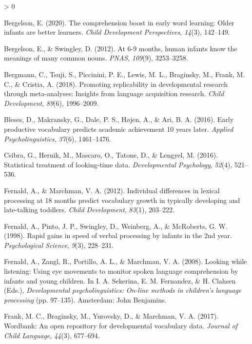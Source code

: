 \documentclass[
  english,
  man,floatsintext]{apa6}
\newlength{\cslhangindent}
\newenvironment{CSLReferences}[2] %
 {%
  \setlength{\parindent}{0pt}
  \ifodd #1 \everypar{\setlength{\hangindent}{\cslhangindent}}\ignorespaces\fi
  \ifnum #2 > 0
  \setlength{\parskip}{#2\baselineskip}
  \fi
 }%
 {}
\begin{document}
\hypertarget{refs}{}
\begin{CSLReferences}{1}{0}
\leavevmode\hypertarget{ref-bergelson2020}{}%
Bergelson, E. (2020). The comprehension boost in early word learning: Older infants are better learners. \emph{Child Development Perspectives}, \emph{14}(3), 142--149.

\leavevmode\hypertarget{ref-bergelson2012}{}%
Bergelson, E., \& Swingley, D. (2012). {At 6-9 months, human infants know the meanings of many common nouns.} \emph{PNAS}, \emph{109}(9), 3253--3258.

\leavevmode\hypertarget{ref-bergmann2018}{}%
Bergmann, C., Tsuji, S., Piccinini, P. E., Lewis, M. L., Braginsky, M., Frank, M. C., \& Cristia, A. (2018). {Promoting replicability in developmental research through meta-analyses: Insights from language acquisition research}. \emph{Child Development}, \emph{89}(6), 1996--2009.

\leavevmode\hypertarget{ref-bleses2016}{}%
Bleses, D., Makransky, G., Dale, P. S., Højen, A., \& Ari, B. A. (2016). {Early productive vocabulary predicts academic achievement 10 years later}. \emph{Applied Psycholinguistics}, \emph{37}(6), 1461--1476.

\leavevmode\hypertarget{ref-csibra2016}{}%
Csibra, G., Hernik, M., Mascaro, O., Tatone, D., \& Lengyel, M. (2016). {Statistical treatment of looking-time data}. \emph{Developmental Psychology}, \emph{52}(4), 521--536.

\leavevmode\hypertarget{ref-fernald2012}{}%
Fernald, A., \& Marchman, V. A. (2012). {Individual differences in lexical processing at 18 months predict vocabulary growth in typically developing and late-talking toddlers.} \emph{Child Development}, \emph{83}(1), 203--222.

\leavevmode\hypertarget{ref-fernald1998}{}%
Fernald, A., Pinto, J. P., Swingley, D., Weinberg, A., \& McRoberts, G. W. (1998). Rapid gains in speed of verbal processing by infants in the 2nd year. \emph{Psychological Science}, \emph{9}(3), 228--231.

\leavevmode\hypertarget{ref-fernald2008}{}%
Fernald, A., Zangl, R., Portillo, A. L., \& Marchman, V. A. (2008). {Looking while listening: Using eye movements to monitor spoken language comprehension by infants and young children}. In I. A. Sekerina, E. M. Fernandez, \& H. Clahsen (Eds.), \emph{Developmental psycholinguistics: On-line methods in children's language processing} (pp. 97--135). Amsterdam: John Benjamins.

\leavevmode\hypertarget{ref-frank2017}{}%
Frank, M. C., Braginsky, M., Yurovsky, D., \& Marchman, V. A. (2017). {Wordbank: An open repository for developmental vocabulary data}. \emph{Journal of Child Language}, \emph{44}(3), 677--694.


\end{CSLReferences}
\end{document}
